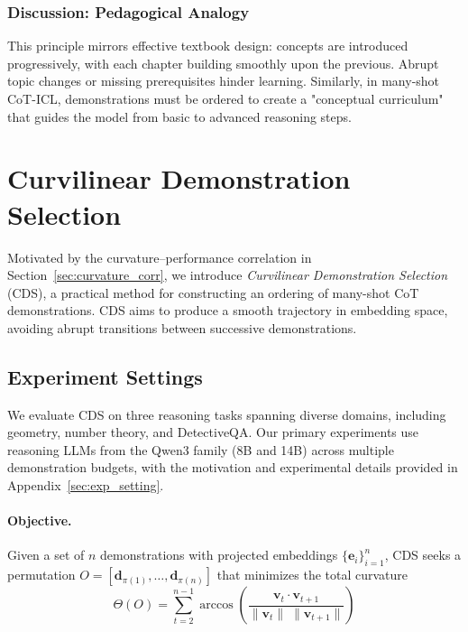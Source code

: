 \documentclass{llmxive}
\begin{document}
\subsubsection{Discussion: Pedagogical Analogy} This principle mirrors effective textbook design: concepts are introduced progressively, with each chapter building smoothly upon the previous. Abrupt topic changes or missing prerequisites hinder learning. Similarly, in many-shot CoT-ICL, demonstrations must be ordered to create a "conceptual curriculum" that guides the model from basic to advanced reasoning steps.







\section{Curvilinear Demonstration Selection}
\label{sec:CDS}

Motivated by the curvature--performance correlation in Section~\ref{sec:curvature_corr}, we introduce \emph{Curvilinear Demonstration Selection} (CDS), a practical method for constructing an ordering of many-shot CoT demonstrations.
CDS aims to produce a smooth trajectory in embedding space, avoiding abrupt transitions between successive demonstrations.

\subsection{Experiment Settings}
We evaluate CDS on three reasoning tasks spanning diverse domains, including geometry, number theory, and DetectiveQA.
Our primary experiments use reasoning LLMs from the Qwen3 family (8B and 14B) across multiple demonstration budgets, with the motivation and experimental details provided in Appendix~\ref{sec:exp_setting}.


\paragraph{Objective.}
Given a set of $n$ demonstrations with projected embeddings $\{\mathbf{e}_i\}_{i=1}^n$, CDS seeks a permutation
$O=[\mathbf{d}_{\pi(1)},\ldots,\mathbf{d}_{\pi(n)}]$
that minimizes the total curvature
\begin{equation}
\Theta(O)=\sum_{t=2}^{n-1}\arccos\!\left(
\frac{\mathbf{v}_t \cdot \mathbf{v}_{t+1}}{\|\mathbf{v}_t\|\;\|\mathbf{v}_{t+1}\|}
\right)
\label{eq:CDS_curvature}
\end{equation}
\end{document}

